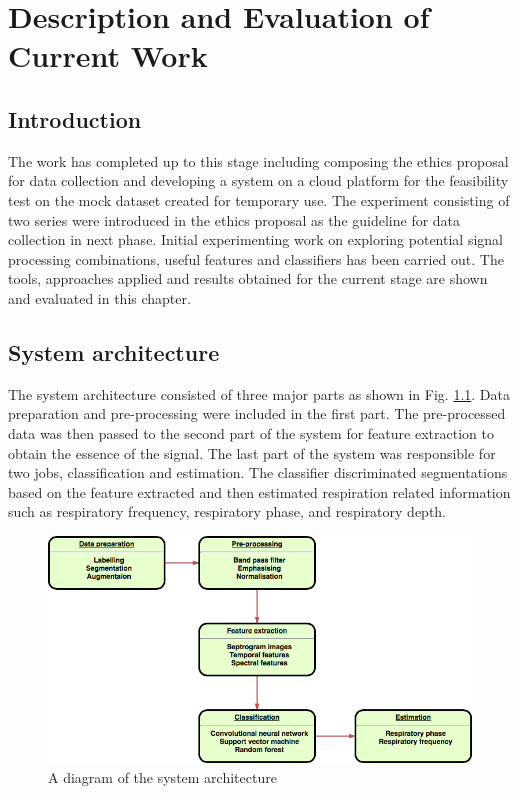 \chapter{Description and Evaluation of Current Work}
\section{Introduction}
The work has completed up to this stage including composing the ethics proposal for data collection and developing a system on a cloud platform for the feasibility test on the mock dataset created for temporary use. The experiment consisting of two series were introduced in the ethics proposal as the guideline for data collection in next phase. Initial experimenting work on exploring potential signal processing combinations, useful features and classifiers has been carried out. The tools, approaches applied and results obtained for the current stage are shown and evaluated in this chapter.

\section{System architecture}
The system architecture consisted of three major parts as shown in Fig. \ref{fig:system_architecture}. Data preparation and pre-processing were included in the first part. The pre-processed data was then passed to the second part of the system for feature extraction to obtain the essence of the signal. The last part of the system was responsible for two jobs, classification and estimation. The classifier discriminated segmentations based on the feature extracted and then estimated respiration related information such as respiratory frequency, respiratory phase, and respiratory depth. 

\begin{figure}[h]
    \centerline{\includegraphics[scale=0.55]{figures/system_architecture.png}}
    \caption{A diagram of the system architecture}
    \label{fig:system_architecture}
\end{figure}

